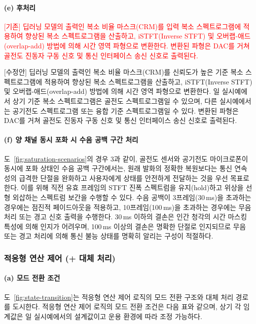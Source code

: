 \documentclass{article}
\newcommand{\reviewold}[1]{{\par\noindent\textcolor{red}{[기존] #1}}}
\newcommand{\reviewnew}[1]{{\par\noindent\textcolor{customblue}{[수정안] #1}}}
\newcommand{\reviewpair}[2]{\reviewold{#1}\reviewnew{#2}\par}
\DeclareRobustCommand{\codexedit}[1]{\textcolor{customorange}{#1}}
\begin{document}
\paragraph{(e) 후처리}

\reviewpair{딥러닝 모델의 출력인 복소 비율 마스크(CRM)를 입력 복소 스펙트로그램에 적용하여 향상된 복소 스펙트로그램을 산출하고, iSTFT(Inverse STFT) 및 오버랩-애드(overlap-add) 방법에 의해 시간 영역 파형으로 변환한다. 변환된 파형은 DAC를 거쳐 골전도 진동자 구동 신호 및 통신 인터페이스 송신 신호로 출력된다.}{딥러닝 모델의 출력인 복소 비율 마스크(CRM)를 신뢰도가 높은 기준 복소 스펙트로그램에 적용하여 향상된 복소 스펙트로그램을 산출하고, iSTFT(Inverse STFT) 및 오버랩-애드(overlap-add) 방법에 의해 시간 영역 파형으로 변환한다. 일 실시예에서 상기 기준 복소 스펙트로그램은 골전도 스펙트로그램일 수 있으며, 다른 실시예에서는 공기전도 스펙트로그램 또는 융합 기준 스펙트로그램일 수 있다. 변환된 파형은 DAC를 거쳐 골전도 진동자 구동 신호 및 통신 인터페이스 송신 신호로 출력된다.}

\paragraph{(f) 양 채널 동시 포화 시 수음 공백 구간 처리}

도~\ref{fig:saturation-scenarios}의 경우 3과 같이, 골전도 센서와 공기전도 마이크로폰이 동시에 포화 상태인 수음 공백 구간에서는, 원래 발화의 정확한 복원보다는 통신 연속성의 급격한 단절을 완화하고 사용자에게 상태를 안전하게 전달하는 것을 우선 목표로 한다. 이를 위해 직전 유효 프레임의 STFT 진폭 스펙트럼을 유지(hold)하고 위상을 선형 외삽하는 스펙트럼 보간을 수행할 수 있다. 수음 공백이 3프레임(30\,ms)을 초과하는 경우에는 점진적 페이드아웃을 적용하고, 10프레임(100\,ms)을 초과하는 경우에는 무음 처리 또는 경고 신호 출력을 수행한다. 30\,ms 이하의 결손은 인간 청각의 시간 마스킹 특성에 의해 인지가 어려우며, 100\,ms 이상의 결손은 명확한 단절로 인지되므로 무음 또는 경고 처리에 의해 통신 불능 상태를 명확히 알리는 구성이 적절하다.

\subsubsection{적응형 연산 제어 (+ 대체 처리)}

\paragraph{(a) 모드 전환 조건}

\codexedit{도~\ref{fig:state-transition}는 적응형 연산 제어 로직의 모드 전환 구조와 대체 처리 경로를 도시한다. 적응형 연산 제어 로직의 모드 전환 조건은 다음 표와 같으며, 상기 각 임계값은 일 실시예에서의 설계값이고 운용 환경에 따라 조정 가능하다.}
\end{document}
